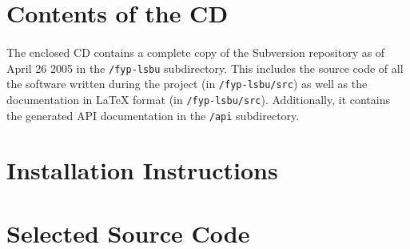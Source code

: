 \appendix
\appendixpage
\addappheadtotoc


\section{Contents of the CD}
\paragraph{}
The enclosed CD contains a complete copy of the Subversion repository as of April 26 2005 in the \texttt{/fyp-lsbu} subdirectory. This includes the source code of all the software written during the project (in \texttt{/fyp-lsbu/src}) as well as the documentation in \LaTeX{} format (in \texttt{/fyp-lsbu/src}). Additionally, it contains the generated API documentation in the \texttt{/api} subdirectory.

\section{Installation Instructions}
\subsection{}


\section{Selected Source Code}
